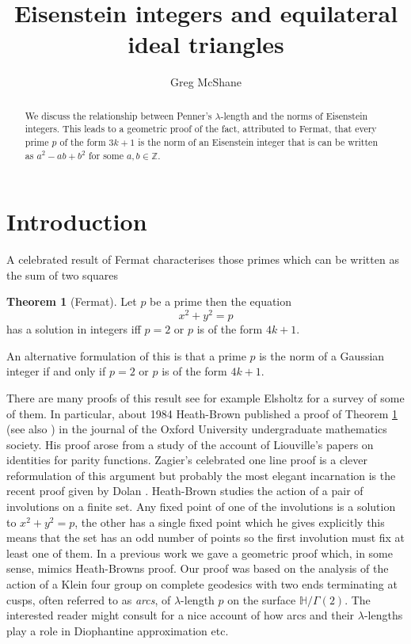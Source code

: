 \documentclass[12pt]{amsart}
\title{Eisenstein integers and equilateral ideal triangles}
\author[McShane]{Greg McShane}
\theoremstyle{plain}
\theoremstyle{definition}
\newtheorem{thm}{Theorem}[section]
\def\HH{\mathbb{H}}
\def\xx{\HH/g2}
\def\ZZ{\mathbb{Z}}
\def\g2{\Gamma(2)}
\def\xx{\HH/\g2}
\begin{document}
\maketitle

\begin{abstract} 
We discuss the relationship between Penner's $\lambda$-length
and the norms of Eisenstein integers. This leads to a geometric
proof of the fact, attributed to Fermat, that every prime $p$ of the form $3k + 1$
is the norm of an Eisenstein integer that is can be written
as $a^2 - ab + b^2$ for some $a,b \in \ZZ$.
\end{abstract} 


\section{Introduction}


A celebrated result of Fermat characterises
those primes which can be written as the sum of two squares

\begin{thm}[Fermat]\label{main}
Let $p$ be a prime then the equation
$$x^2 + y^2 = p $$
has a solution in integers  iff  $p =2$ or $p$ is of the form $4k + 1$.
\end{thm}

An alternative formulation of this  is that
a prime $p$ is the norm of a Gaussian integer
if and only if $p =2$ or $p$ is of the form $4k + 1$.

There are many proofs of this result see for example Elsholtz
\cite{elsholtz} for a survey of some of them.
In particular, about  1984 Heath-Brown published a proof of Theorem
\ref{main} (see also \cite{aigner2})
  in the journal of the Oxford University undergraduate mathematics society. 
His proof arose from a study of the account of Liouville’s papers on
identities for parity functions. Zagier's celebrated one line proof
\cite{zagier} is a clever reformulation of this argument but
probably the most elegant incarnation is the recent proof given by
Dolan \cite{dolan}. 
Heath-Brown studies the action of a pair of involutions on a finite
set.  
Any fixed point of one of the involutions is a solution 
to $x^2 + y^2 = p$,
the other has a single fixed point which he gives explicitly
this means that the set has an odd number of points so the first
involution must fix at least one of them.
In a previous work \cite{vlad} 
we gave a geometric proof which, in some sense,
mimics Heath-Browns proof.
Our proof was based on the analysis of the action of a  Klein four group 
on complete geodesics with two ends terminating at cusps, often referred to as \textit{arcs}, of
$\lambda$-length $p$ on the surface $\xx$.
The interested reader might consult \cite{springborn1, springborn2}
for a nice account of how arcs and their $\lambda$-lengths
play a role in Diophantine approximation etc.
\end{document}
